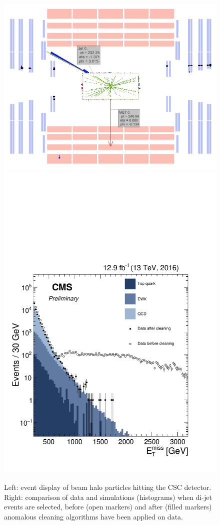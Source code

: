 \begin{figure}[!htb]
  \centering
    \includegraphics[width=.45\textwidth]{figures/MetPlots/BeamHalo_event_display.png}%
    \includegraphics[width=.35\textwidth]{figures/MetPlots/Filters.pdf}

  \caption{Left: event display of beam halo particles hitting the CSC detector. Right: comparison of data and simulations (histograms) when di-jet events are selected, before (open markers) and after (filled markers) anomalous \MET cleaning algorithms have been applied on data.~\cite{CMS:2016ljj}}
  \label{fig:met_filters}
\end{figure}

